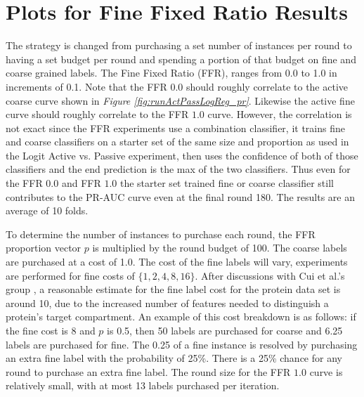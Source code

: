 \documentclass[ms]{nuthesis}
\begin{document}
\section{Plots for Fine Fixed Ratio Results}
\label{ffrSection}
\par The strategy is changed from purchasing a set number of instances
    per round to having a set budget per round and spending a portion of that budget
    on fine and coarse grained labels. The Fine Fixed Ratio (FFR), ranges from 0.0 to
    1.0 in increments of 0.1. Note that the FFR $0.0$ should roughly correlate to the
    active coarse curve shown in \textit{Figure \ref{fig:runActPassLogReg_pr}}. Likewise
    the active fine curve should roughly correlate to the FFR $1.0$ curve. However, the correlation
    is not exact since the FFR experiments use a combination classifier, it trains fine and
    coarse classifiers on a starter set of the same size and proportion as used in the
    Logit Active vs. Passive experiment, then uses the confidence of both of those classifiers and
    the end prediction is the max of the two classifiers. Thus even for the FFR $0.0$ and FFR $1.0$
    the starter set trained fine or coarse classifier still contributes to the PR-AUC curve
    even at the final round 180. The results are an average of 10 folds.

    \par To determine the number of instances to purchase each round, the FFR proportion vector $p$
    is multiplied by the
    round budget of 100. The coarse labels are purchased at a cost of 1.0.
    The cost of the fine labels will vary, experiments are performed for fine costs of $\{1,2,4,8,16\}$. After
     discussions with Cui et al.'s group \cite{bioPoster}, a reasonable estimate for the fine label cost
      for the protein data set is around 10, due to the increased number of features needed to distinguish
      a protein's target compartment. An example of this cost breakdown is as follows:
      if the fine cost is 8 and $p$ is 0.5, then 50 labels are
      purchased for coarse and 6.25 labels are purchased for fine. The 0.25 of a fine instance is
      resolved by purchasing
    an extra fine label with the probability of 25\%. There is a 25\% chance for any round to
    purchase an extra fine label. The round size for the FFR $1.0$ curve is relatively small, with
    at most 13 labels purchased per iteration.
\end{document}
